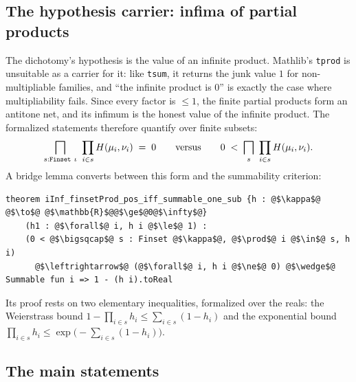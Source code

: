 \documentclass[a4paper,UKenglish,autoref,thm-restate]{lipics-v2021}
\newcommand{\leanid}[1]{{\def\_{\textunderscore\allowbreak}\texttt{#1}}}
\begin{document}
\subsection{The hypothesis carrier: infima of partial products}
\label{sec:carrier}

The dichotomy's hypothesis is the value of an infinite product. Mathlib's
\leanid{tprod} is unsuitable as a carrier for it: like \leanid{tsum}, it
returns the junk value $1$ for non-multipliable families, and ``the infinite
product is $0$'' is exactly the case where multipliability fails. Since every
factor is $\le 1$, the finite partial products form an antitone net, and its
infimum is the honest value of the infinite product. The formalized
statements therefore quantify over finite subsets:
\[
  \bigsqcap_{s : \leanid{Finset}\ \iota}\ \prod_{i \in s}
  H(\mu_i, \nu_i)
  \;=\; 0
  \qquad\text{versus}\qquad
  0 \;<\; \bigsqcap_{s}\ \prod_{i \in s} H(\mu_i, \nu_i).
\]
A bridge lemma converts between this form and the summability criterion:
\begin{lstlisting}
theorem iInf_finsetProd_pos_iff_summable_one_sub {h : @$\kappa$@ @$\to$@ @$\mathbb{R}$@@$\ge$@0@$\infty$@}
    (h1 : @$\forall$@ i, h i @$\le$@ 1) :
    (0 < @$\bigsqcap$@ s : Finset @$\kappa$@, @$\prod$@ i @$\in$@ s, h i)
      @$\leftrightarrow$@ (@$\forall$@ i, h i @$\ne$@ 0) @$\wedge$@ Summable fun i => 1 - (h i).toReal
\end{lstlisting}
Its proof rests on two elementary inequalities, formalized over the reals: the
Weierstrass bound $1 - \prod_{i \in s} h_i \le \sum_{i \in s} (1 - h_i)$ and
the exponential bound $\prod_{i \in s} h_i \le \exp\bigl(-\sum_{i \in s} (1 -
h_i)\bigr)$.

\subsection{The main statements}
\label{sec:statements}
\end{document}
